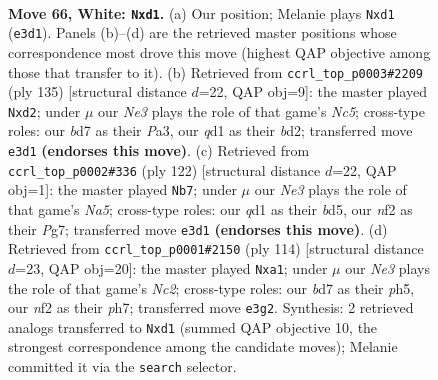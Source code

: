 \documentclass[11pt]{article}
\begin{document}
\clearpage

\begin{figure}[p]\centering
\begin{subfigure}{0.46\textwidth}\centering
\resizebox{\linewidth}{!}{%
\newchessgame
\chessboard[
  setfen={8/k2b4/8/P3K3/1P6/4N3/5n2/3q4 w - - 0 66},
  showmover=false,
  pgfstyle=straightmove, color=movearrow, markmove={e3-d1}
]}
\caption{}
\end{subfigure}\hfill
\begin{subfigure}{0.46\textwidth}\centering
\resizebox{\linewidth}{!}{%
\newchessgame
\chessboard[
  setfen={8/5k2/8/8/1pn1p3/pN5P/3BK3/8 b - - 4 68},
  showmover=false,
  pgfstyle=straightmove, color=movearrow, markmove={c4-d2}
]}
\caption{}
\end{subfigure}
\\[4pt]
\begin{subfigure}{0.46\textwidth}\centering
\resizebox{\linewidth}{!}{%
\newchessgame
\chessboard[
  setfen={8/6P1/5k1p/N2b3P/8/8/5K2/8 w - - 1 62},
  showmover=false,
  pgfstyle=straightmove, color=movearrow, markmove={a5-b7}
]}
\caption{}
\end{subfigure}\hfill
\begin{subfigure}{0.46\textwidth}\centering
\resizebox{\linewidth}{!}{%
\newchessgame
\chessboard[
  setfen={8/7p/8/7p/5k2/1K5P/2N3P1/q7 w - - 0 58},
  showmover=false,
  pgfstyle=straightmove, color=movearrow, markmove={c2-a1}
]}
\caption{}
\end{subfigure}
\caption{\textbf{Move 66, White: \texttt{Nxd1}.} (a) Our position; Melanie plays \texttt{Nxd1} (\texttt{e3d1}). Panels (b)--(d) are the retrieved master positions whose correspondence most drove this move (highest QAP objective among those that transfer to it). (b) Retrieved from \texttt{ccrl\_top\_p0003\#2209} (ply 135) [structural distance $d$=22, QAP obj=9]: the master played \texttt{Nxd2}; under $\mu$ our \emph{Ne3} plays the role of that game's \emph{Nc5}; cross-type roles: our \emph{b}d7 as their \emph{P}a3, our \emph{q}d1 as their \emph{b}d2; transferred move \texttt{e3d1} \textbf{(endorses this move)}. (c) Retrieved from \texttt{ccrl\_top\_p0002\#336} (ply 122) [structural distance $d$=22, QAP obj=1]: the master played \texttt{Nb7}; under $\mu$ our \emph{Ne3} plays the role of that game's \emph{Na5}; cross-type roles: our \emph{q}d1 as their \emph{b}d5, our \emph{n}f2 as their \emph{P}g7; transferred move \texttt{e3d1} \textbf{(endorses this move)}. (d) Retrieved from \texttt{ccrl\_top\_p0001\#2150} (ply 114) [structural distance $d$=23, QAP obj=20]: the master played \texttt{Nxa1}; under $\mu$ our \emph{Ne3} plays the role of that game's \emph{Nc2}; cross-type roles: our \emph{b}d7 as their \emph{p}h5, our \emph{n}f2 as their \emph{p}h7; transferred move \texttt{e3g2}. Synthesis: 2 retrieved analogs transferred to \texttt{Nxd1} (summed QAP objective 10, the strongest correspondence among the candidate moves); Melanie committed it via the \texttt{search} selector.}
\label{fig:thought-m130}
\end{figure}
\end{document}
